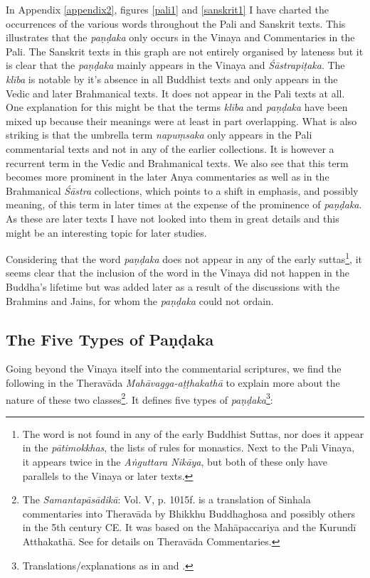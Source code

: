 In Appendix \ref{appendix2}, figures \ref{pali1} and \ref{sanskrit1} I have charted the occurrences of the various words throughout the Pali and Sanskrit texts. This illustrates that the {\em paṇḍaka} only occurs in the Vinaya and Commentaries in the Pali. The Sanskrit texts in this graph are not entirely organised by lateness but it is clear that the {\em paṇḍaka} mainly appears in the Vinaya and {\em Śāstrapiṭaka}. The {\em klība} is notable by it's absence in all Buddhist texts and only appears in the Vedic and later Brahmanical texts. It does not appear in the Pali texts at all. One explanation for this might be that the terms {\em klība} and {\em paṇḍaka} have been mixed up because their meanings were at least in part overlapping. What is also striking is that the umbrella term {\em napuṃsaka} only appears in the Pali commentarial texts and not in any of the earlier collections. It is however a recurrent term in the Vedic and Brahmanical texts. We also see that this term becomes more prominent in the later Anya commentaries as well as in the Brahmanical {\em Śāstra} collections, which points to a shift in emphasis, and possibly meaning, of this term in later times at the expense of the prominence of {\em paṇḍaka}. As these are later texts I have not looked into them in great details and this might be an interesting topic for later studies.

Considering that the word {\em paṇḍaka} does not appear in any of the early suttas\footnote{The word is not found in any of the early Buddhist Suttas, nor does it appear in the {\em pātimokkhas}, the lists of rules for monastics. Next to the Pali Vinaya, it appears twice in the {\em Aṅguttara Nikāya}, but both of these only have parallels to the Vinaya or later texts.}, it seems clear that the inclusion of the word in the Vinaya did not happen in the Buddha's lifetime but was added later as a result of the discussions with the Brahmins and Jains, for whom the {\em paṇḍaka} could not ordain.

\subsection{The Five Types of Paṇḍaka}
Going beyond the Vinaya itself into the commentarial scriptures, we find the following in the Theravāda {\em Mahāvagga-aṭṭhakathā} to explain more about the nature of these two classes\footnote{The {\em Samantapāsādikā}: Vol. V, p. 1015f. is a translation of Sinhala commentaries into Theravāda by Bhikkhu Buddhaghosa and possibly others in the 5th century CE. It was based on the Mahāpaccariya and the Kurundī Atthakathā. See \cite{goonesekere} for details on Theravāda Commentaries.}. It defines five types of {\em paṇḍaka}\footnote{Translations/explanations as in \cite{bomhard} and \cite{thanissaro}.}:

